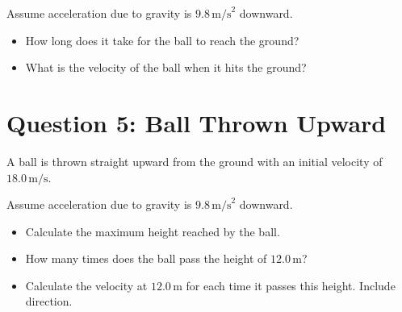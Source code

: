 \documentclass[12pt]{article}
\begin{document}
Assume acceleration due to gravity is $9.8 \, \text{m/s}^2$ downward.

\begin{itemize}
\item[(a)] How long does it take for the ball to reach the ground?
\vspace{8cm}

\item[(b)] What is the velocity of the ball when it hits the ground?
\vspace{8cm}

\end{itemize}

\newpage

\section*{Question 5: Ball Thrown Upward}

A ball is thrown straight upward from the ground with an initial velocity of $18.0 \, \text{m/s}$.

Assume acceleration due to gravity is $9.8 \, \text{m/s}^2$ downward.

\begin{itemize}
\item[(a)] Calculate the maximum height reached by the ball.
\vspace{8cm}

\item[(b)] How many times does the ball pass the height of $12.0 \, \text{m}$?
\vspace{6cm}

\item[(c)] Calculate the velocity at $12.0 \, \text{m}$ for each time it passes this height. Include direction.
\vspace{10cm}

\end{itemize}
\end{document}
